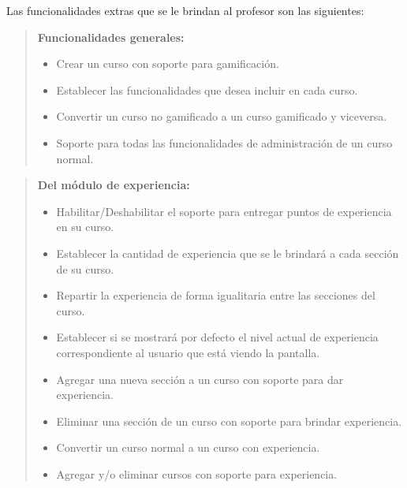     \noindent
    Las funcionalidades extras que se le brindan al profesor son las siguientes:

    \begin{quote}
    {\bf Funcionalidades generales:}
        \begin{itemize}
        \item Crear un curso con soporte para gamificación.
        \item Establecer las funcionalidades que desea incluir en cada curso.
        \item Convertir un curso no gamificado a un curso gamificado y viceversa.
        \item Soporte para todas las funcionalidades de administración de un curso
              normal.
        \end{itemize}
    \end{quote}

    \begin{quote}
    {\bf Del módulo de experiencia:}
        \begin{itemize}
        \item Habilitar/Deshabilitar el soporte para entregar puntos de experiencia
              en su curso.
        \item Establecer la cantidad de experiencia que se le brindará a cada
              sección de su curso.
        \item Repartir la experiencia de forma igualitaria entre las secciones del
              curso.
        \item Establecer si se mostrará por defecto el nivel actual de experiencia
              correspondiente al usuario que está viendo la pantalla.
        \item Agregar una nueva sección a un curso con soporte para dar experiencia.
        \item Eliminar una sección de un curso con soporte para brindar experiencia.
        \item Convertir un curso normal a un curso con experiencia.
        \item Agregar y/o eliminar cursos con soporte para experiencia.
        \end{itemize}
    \end{quote}


